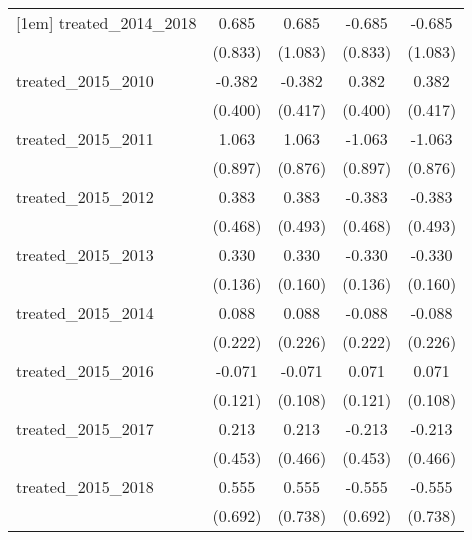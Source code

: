{\begin{tabular}{l*{4}{c}}
[1em]
treated\_2014\_2018&       0.685         &       0.685         &      -0.685         &      -0.685         \\
            &     (0.833)         &     (1.083)         &     (0.833)         &     (1.083)         \\
[1em]
treated\_2015\_2010&      -0.382         &      -0.382         &       0.382         &       0.382         \\
            &     (0.400)         &     (0.417)         &     (0.400)         &     (0.417)         \\
[1em]
treated\_2015\_2011&       1.063         &       1.063         &      -1.063         &      -1.063         \\
            &     (0.897)         &     (0.876)         &     (0.897)         &     (0.876)         \\
[1em]
treated\_2015\_2012&       0.383         &       0.383         &      -0.383         &      -0.383         \\
            &     (0.468)         &     (0.493)         &     (0.468)         &     (0.493)         \\
[1em]
treated\_2015\_2013&       0.330\sym{*}  &       0.330\sym{*}  &      -0.330\sym{*}  &      -0.330\sym{*}  \\
            &     (0.136)         &     (0.160)         &     (0.136)         &     (0.160)         \\
[1em]
treated\_2015\_2014&       0.088         &       0.088         &      -0.088         &      -0.088         \\
            &     (0.222)         &     (0.226)         &     (0.222)         &     (0.226)         \\
[1em]
treated\_2015\_2016&      -0.071         &      -0.071         &       0.071         &       0.071         \\
            &     (0.121)         &     (0.108)         &     (0.121)         &     (0.108)         \\
[1em]
treated\_2015\_2017&       0.213         &       0.213         &      -0.213         &      -0.213         \\
            &     (0.453)         &     (0.466)         &     (0.453)         &     (0.466)         \\
[1em]
treated\_2015\_2018&       0.555         &       0.555         &      -0.555         &      -0.555         \\
            &     (0.692)         &     (0.738)         &     (0.692)         &     (0.738)         \\

\end{tabular}}
